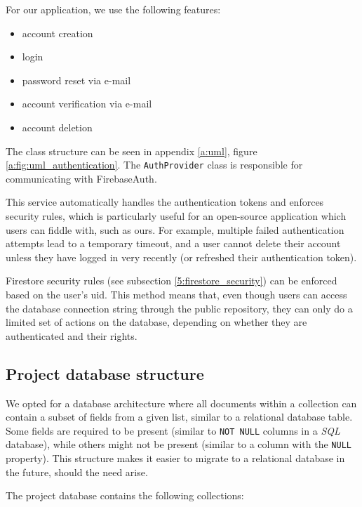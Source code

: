 For our application, we use the following features:
\begin{itemize}
    \setlength{\topsep}{0.5pt}
    \setlength{\itemsep}{0.5pt}
    \setlength{\parsep}{0.5pt}
    \item account creation
    \item login
    \item password reset via e-mail
    \item account verification via e-mail
    \item account deletion
\end{itemize}

The class structure can be seen in appendix \ref{a:uml}, figure \ref{a:fig:uml_authentication}. The \texttt{AuthProvider} class is responsible for communicating with FirebaseAuth.

This service automatically handles the authentication tokens and enforces security rules, which is particularly useful for an open-source application which users can fiddle with, such as ours. For example, multiple failed authentication attempts lead to a temporary timeout, and a user cannot delete their account unless they have logged in very recently (or refreshed their authentication token).

Firestore security rules (see subsection \ref{5:firestore_security}) can be enforced based on the user's \acrshort{uid}. This method means that, even though users can access the database connection string through the public repository, they can only do a limited set of actions on the database, depending on whether they are authenticated and their rights.

\subsection{Project database structure} \label{5:database_project}
We opted for a database architecture where all documents within a collection can contain a subset of fields from a given list, similar to a relational database table. Some fields are required to be present (similar to \texttt{NOT NULL} columns in a \textit{SQL} database), while others might not be present (similar to a column with the \texttt{NULL} property). This structure makes it easier to migrate to a relational database in the future, should the need arise.

The project database contains the following collections:

~

